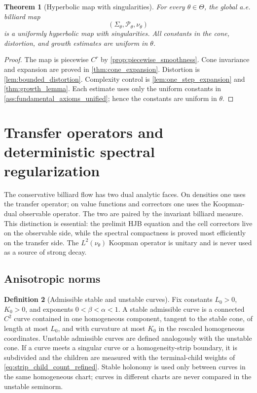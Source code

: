 \documentclass[12pt, letterpaper]{amsart}
\newcommand{\Pcal}{\mathcal{P}}
\newcommand{\Thetacal}{\Theta}
\theoremstyle{plain}
\newtheorem{theorem}{Theorem}[section]
\theoremstyle{definition}
\newtheorem{definition}[theorem]{Definition}
\theoremstyle{remark}
\begin{document}
\begin{theorem}[Hyperbolic map with singularities]
\label{thm:hyperbolic_with_singularities}
For every $\theta\in\Thetacal$, the global a.e. billiard map
\begin{equation}
    (\Sigma_\theta,\Pcal_\theta,\nu_\theta)
\end{equation}
is a uniformly hyperbolic map with singularities.  All constants in the cone, distortion, and growth estimates are uniform in $\theta$.
\end{theorem}

\begin{proof}
The map is piecewise $C^r$ by \cref{prop:piecewise_smoothness}.  Cone invariance and expansion are proved in \cref{thm:cone_expansion}.  Distortion is \cref{lem:bounded_distortion}.  Complexity control is \cref{lem:one_step_expansion} and \cref{thm:growth_lemma}.  Each estimate uses only the uniform constants in \cref{ass:fundamental_axioms_unified}; hence the constants are uniform in $\theta$.
\end{proof}

\section{Transfer operators and deterministic spectral regularization}
\label{sec:transfer_singular}

The conservative billiard flow has two dual analytic faces.  On densities one uses the transfer operator; on value functions and correctors one uses the Koopman-dual observable operator.  The two are paired by the invariant billiard measure.  This distinction is essential: the prelimit HJB equation and the cell correctors live on the observable side, while the spectral compactness is proved most efficiently on the transfer side.  The $L^2(\nu_\theta)$ Koopman operator is unitary and is never used as a source of strong decay.


\subsection{Anisotropic norms}

\begin{definition}[Admissible stable and unstable curves]
\label{def:admissible_stable_unstable_curves}
Fix constants $L_0>0$, $K_0>0$, and exponents $0<\beta<\alpha<1$.  A stable
admissible curve is a connected $C^2$ curve contained in one homogeneous
component, tangent to the stable cone, of length at most $L_0$, and with
curvature at most $K_0$ in the rescaled homogeneous coordinates.  Unstable
admissible curves are defined analogously with the unstable cone.  If a curve
meets a singular curve or a homogeneity-strip boundary, it is subdivided and the
children are measured with the terminal-child weights of
\eqref{eq:strip_child_count_refined}.  Stable holonomy is used only between
curves in the same homogeneous chart; curves in different charts are never
compared in the unstable seminorm.
\end{definition}
\end{document}
